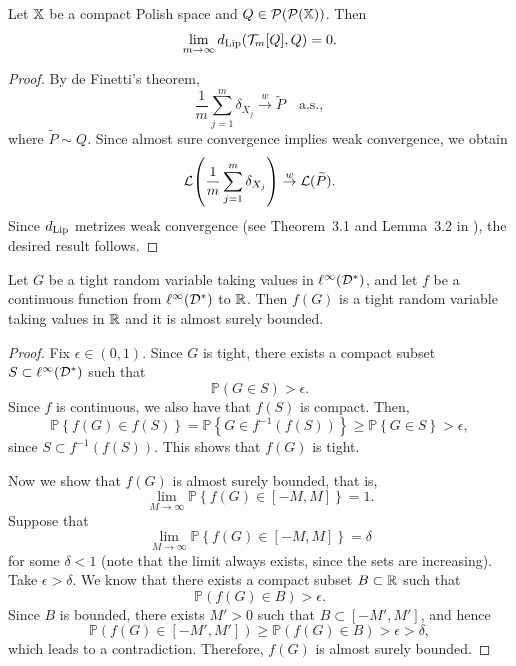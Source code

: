 \begin{lemma}\label{lemma::convergence_Qm}
Let $\mathbb{X}$ be a compact Polish space and $Q \in \mathcal{P}(\mathcal{P}(\mathbb{X}))$. Then
\[
\lim_{m \to \infty} d_{\mathrm{Lip}}\!\left(\mathcal{T}_m[Q], Q\right) = 0.
\]
\end{lemma}
\begin{proof}
By de Finetti’s theorem,
\[
\frac{1}{m}\sum_{j = 1}^m \delta_{X_j}
\overset{w}{\to} \widetilde{P}
\quad \text{a.s.},
\]
where $\widetilde{P} \sim Q$. Since almost sure convergence implies weak convergence, we obtain
\[
\mathcal{L}\!\left( \frac{1}{m}\sum_{j = 1}^m \delta_{X_j} \right)
\overset{w}{\to}
\mathcal{L}(\widetilde{P}).
\]
Since $d_{\mathrm{Lip}}$ metrizes weak convergence (see Theorem~3.1 and Lemma~3.2 in \cite{catalano2024hierarchical}), the desired result follows.
\end{proof}

\begin{lemma}\label{lemma::tightness_under_continuity}
Let $G$ be a tight random variable taking values in $\ell^\infty(\mathcal{D}^*)$, and let $f$ be a continuous function from $\ell^\infty(\mathcal{D}^*)$ to $\mathbb{R}$. Then $f(G)$ is a tight random variable taking values in $\mathbb{R}$ and it is almost surely bounded.
\end{lemma}
\begin{proof}
Fix $\epsilon \in (0,1)$. Since $G$ is tight, there exists a compact subset $S \subset \ell^\infty(\mathcal{D}^*)$ such that
\[
\mathbb{P}\left(G \in S\right) > \epsilon.
\]
Since $f$ is continuous, we also have that $f(S)$ is compact. Then,
\[
\mathbb{P}\left\{ f(G) \in f(S) \right\}
= \mathbb{P}\left\{ G \in f^{-1}\left(f(S)\right) \right\}
\geq \mathbb{P}\left\{ G \in S \right\}
> \epsilon,
\]
since $S \subset f^{-1}\left(f(S)\right)$. This shows that $f(G)$ is tight.

Now we show that $f(G)$ is almost surely bounded, that is,
\[
\lim_{M \to \infty} \mathbb{P}\left\{ f(G) \in [-M, M] \right\} = 1.
\]
Suppose that
\[
\lim_{M \to \infty} \mathbb{P}\left\{ f(G) \in [-M, M] \right\} = \delta
\]
for some $\delta < 1$ (note that the limit always exists, since the sets are increasing). Take $\epsilon > \delta$. We know that there exists a compact subset $B \subset \mathbb{R}$ such that
\[
\mathbb{P}\left(f(G) \in B\right) > \epsilon.
\]
Since $B$ is bounded, there exists $M' > 0$ such that $B \subset [-M', M']$, and hence
\[
\mathbb{P}\left(f(G) \in [-M', M']\right)
\geq \mathbb{P}\left(f(G) \in B\right)
> \epsilon
> \delta,
\]
which leads to a contradiction. Therefore, $f(G)$ is almost surely bounded.
\end{proof}






